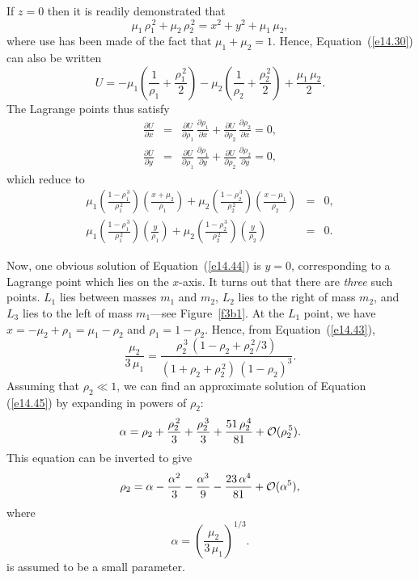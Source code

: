 If $z=0$ then it is readily demonstrated that
\begin{equation}
\mu_1\,\rho_1^{\,2} + \mu_2\,\rho_2^{\,2} = x^2+y^2+\mu_1\,\mu_2,
\end{equation}
where use has been made of the fact that $\mu_1+\mu_2=1$. 
Hence, Equation~(\ref{e14.30}) can also be written
\begin{equation}\label{e14.40}
U = - \mu_1\left(\frac{1}{\rho_1}+\frac{\rho_1^{\,2}}{2}\right)
- \mu_2\left(\frac{1}{\rho_2}+\frac{\rho_2^{\,2}}{2}\right) + \frac{\mu_1\,\mu_2}{2}.
\end{equation}
The Lagrange points thus satisfy
\begin{eqnarray}\label{e14.41}
\frac{\partial U}{\partial x} &=& \frac{\partial U}{\partial \rho_1}\,\frac{\partial \rho_1}{\partial x}+\frac{\partial U}{\partial \rho_2}\,\frac{\partial \rho_2}{\partial x}=0,\\[0.5ex]
\frac{\partial U}{\partial y} &=& \frac{\partial U}{\partial \rho_1}\,\frac{\partial \rho_1}{\partial y}+\frac{\partial U}{\partial \rho_2}\,\frac{\partial \rho_2}{\partial y}=0,\label{e14.42}
\end{eqnarray}
which reduce to
\begin{eqnarray}\label{e14.43}
\mu_1\left(\frac{1-\rho_1^{\,3}}{\rho_1^{\,2}}\right)\left(\frac{x+\mu_2}{\rho_1}\right)
+\mu_2\left(\frac{1-\rho_2^{\,3}}{\rho_2^{\,2}}\right)\left(\frac{x-\mu_1}{\rho_2}\right)&=&0, \\[0.5ex]
\mu_1\left(\frac{1-\rho_1^{\,3}}{\rho_1^{\,2}}\right)\left(\frac{y}{\rho_1}\right)
+\mu_2\left(\frac{1-\rho_2^{\,3}}{\rho_2^{\,2}}\right)\left(\frac{y}{\rho_2}\right)&=&0.\label{e14.44}
\end{eqnarray}

Now, one obvious solution of Equation~(\ref{e14.44}) is $y=0$, corresponding to a Lagrange
point which lies on the $x$-axis. It turns out that there are {\em three}\/ such points. $L_1$
lies between masses $m_1$ and $m_2$, $L_2$ lies to the right of mass $m_2$, and
$L_3$ lies to the left of mass $m_1$---see Figure~\ref{f3b1}. At the $L_1$ point,
we have $x = -\mu_2+\rho_1=\mu_1-\rho_2$ and $\rho_1=1-\rho_2$. Hence, from Equation~(\ref{e14.43}),
\begin{equation}\label{e14.45}
\frac{\mu_2}{3\,\mu_1} = \frac{\rho_2^{\,3}\,(1-\rho_2+\rho_2^{\,2}/3)}{(1+\rho_2+\rho_2^{\,2})\,(1-\rho_2)^3}.
\end{equation}
Assuming that $\rho_2\ll 1$, we can find an approximate solution of Equation (\ref{e14.45})
by expanding in powers of $\rho_2$:
\begin{equation}
\alpha = \rho_2 + \frac{\rho_2^{\,2}}{3} + \frac{\rho_2^{\,3}}{3} + \frac{51\,\rho_2^{\,4}}{81}+ {\cal O}(\rho_2^{\,5}).
\end{equation}
This equation can be inverted to give
\begin{equation}
\rho_2 = \alpha - \frac{\alpha^2}{3} - \frac{\alpha^3}{9} -\frac{23\,\alpha^4}{81}+{\cal O}(\alpha^5),
\end{equation}
where
\begin{equation}
\alpha = \left(\frac{\mu_2}{3\,\mu_1}\right)^{1/3}.
\end{equation}
is assumed to be a small parameter.

